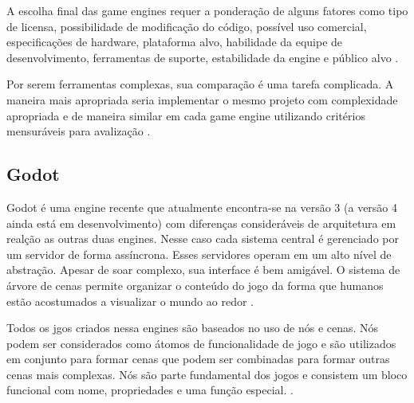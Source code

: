 A escolha final das game engines requer a ponderação de alguns fatores como tipo de licensa, possibilidade de modificação do código, possível uso comercial, especificações de hardware, plataforma alvo, habilidade da equipe de desenvolvimento, ferramentas de suporte, estabilidade da engine e público alvo \cite{navarro2012}.

Por serem ferramentas complexas, sua comparação é uma tarefa complicada. A maneira mais apropriada seria implementar o mesmo projeto com complexidade apropriada e de maneira similar em cada game engine utilizando critérios mensuráveis para avalização \cite{vsmid2017comparison}.  

\subsection{Godot}
\label{sec:godot}

Godot é uma engine recente que atualmente encontra-se na versão 3 (a versão 4 ainda está em desenvolvimento) com diferenças consideráveis de arquitetura em realção as outras duas engines. Nesse caso cada sistema central é gerenciado por um servidor de forma assíncrona. Esses servidores operam em um alto nível de abstração. Apesar de soar complexo, sua interface é bem amigável. O sistema de árvore de cenas permite organizar o conteúdo do jogo da forma que humanos estão acostumados a visualizar o mundo ao redor \cite{godotEngine}.

Todos os jgos criados nessa engines são baseados no uso de nós e cenas. Nós podem ser considerados como átomos de funcionalidade de jogo e são utilizados em conjunto para formar cenas que podem ser combinadas para formar outras cenas mais complexas. Nós são parte fundamental dos jogos e consistem um bloco funcional com nome, propriedades e uma função especial. \cite{godotEngine}.

\begin{figure}[h!]
	\centering
\end{figure}
\nocite{gdtree}

